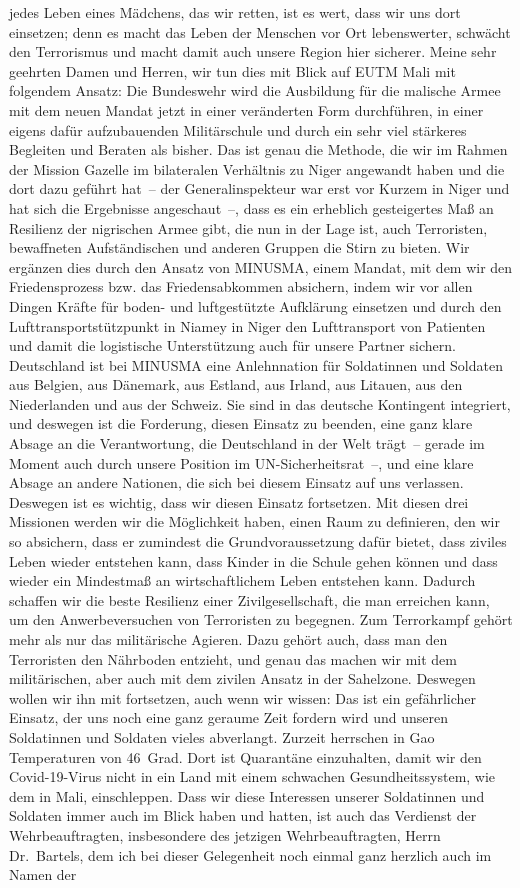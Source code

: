 \documentclass{article}
\begin{document}
jedes Leben eines Mädchens, das wir retten, ist es wert, dass wir uns dort einsetzen; denn es macht das Leben der Menschen vor Ort lebenswerter, schwächt den Terrorismus und macht damit auch unsere Region hier sicherer.  Meine sehr geehrten Damen und Herren, wir tun dies mit Blick auf EUTM Mali mit folgendem Ansatz: Die Bundeswehr wird die Ausbildung für die malische Armee mit dem neuen Mandat jetzt in einer veränderten Form durchführen, in einer eigens dafür aufzubauenden Militärschule und durch ein sehr viel stärkeres Begleiten und Beraten als bisher. Das ist genau die Methode, die wir im Rahmen der Mission Gazelle im bilateralen Verhältnis zu Niger angewandt haben und die dort dazu geführt hat – der Generalinspekteur war erst vor Kurzem in Niger und hat sich die Ergebnisse angeschaut –, dass es ein erheblich gesteigertes Maß an Resilienz der nigrischen Armee gibt, die nun in der Lage ist, auch Terroristen, bewaffneten Aufständischen und anderen Gruppen die Stirn zu bieten. Wir ergänzen dies durch den Ansatz von MINUSMA, einem Mandat, mit dem wir den Friedensprozess bzw. das Friedensabkommen absichern, indem wir vor allen Dingen Kräfte für boden- und luftgestützte Aufklärung einsetzen und durch den Lufttransportstützpunkt in Niamey in Niger den Lufttransport von Patienten und damit die logistische Unterstützung auch für unsere Partner sichern. Deutschland ist bei MINUSMA eine Anlehnnation für Soldatinnen und Soldaten aus Belgien, aus Dänemark, aus Estland, aus Irland, aus Litauen, aus den Niederlanden und aus der Schweiz. Sie sind in das deutsche Kontingent integriert, und deswegen ist die Forderung, diesen Einsatz zu beenden, eine ganz klare Absage an die Verantwortung, die Deutschland in der Welt trägt – gerade im Moment auch durch unsere Position im UN-Sicherheitsrat –, und eine klare Absage an andere Nationen, die sich bei diesem Einsatz auf uns verlassen. Deswegen ist es wichtig, dass wir diesen Einsatz fortsetzen.  Mit diesen drei Missionen werden wir die Möglichkeit haben, einen Raum zu definieren, den wir so absichern, dass er zumindest die Grundvoraussetzung dafür bietet, dass ziviles Leben wieder entstehen kann,  dass Kinder in die Schule gehen können und dass wieder ein Mindestmaß an wirtschaftlichem Leben entstehen kann. Dadurch schaffen wir die beste Resilienz einer Zivilgesellschaft, die man erreichen kann, um den Anwerbeversuchen von Terroristen zu begegnen. Zum Terrorkampf gehört mehr als nur das militärische Agieren. Dazu gehört auch, dass man den Terroristen den Nährboden entzieht, und genau das machen wir mit dem militärischen, aber auch mit dem zivilen Ansatz in der Sahelzone. Deswegen wollen wir ihn mit fortsetzen, auch wenn wir wissen: Das ist ein gefährlicher Einsatz, der uns noch eine ganz geraume Zeit fordern wird und unseren Soldatinnen und Soldaten vieles abverlangt. Zurzeit herrschen in Gao Temperaturen von 46 Grad. Dort ist Quarantäne einzuhalten, damit wir den Covid-19-Virus nicht in ein Land mit einem schwachen Gesundheitssystem, wie dem in Mali, einschleppen. Dass wir diese Interessen unserer Soldatinnen und Soldaten immer auch im Blick haben und hatten, ist auch das Verdienst der Wehrbeauftragten, insbesondere des jetzigen Wehrbeauftragten, Herrn Dr. Bartels, dem ich bei dieser Gelegenheit noch einmal ganz herzlich auch im Namen der 
\end{document}
